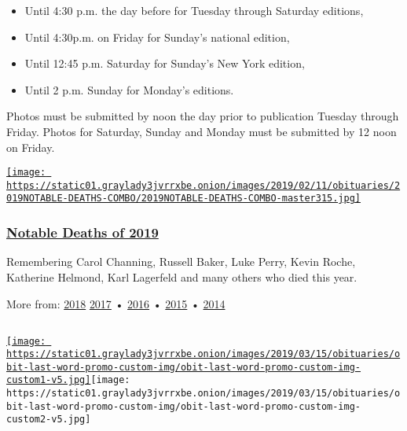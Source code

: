 \begin{itemize}
\tightlist
\item
  Until 4:30 p.m. the day before for Tuesday through Saturday editions,
\item
  Until 4:30p.m. on Friday for Sunday's national edition,
\item
  Until 12:45 p.m. Saturday for Sunday's New York edition,
\item
  Until 2 p.m. Sunday for Monday's editions.
\end{itemize}

Photos must be submitted by noon the day prior to publication Tuesday
through Friday. Photos for Saturday, Sunday and Monday must be submitted
by 12 noon on Friday.

\href{https://www.nytimes3xbfgragh.onion/interactive/2019/obituaries/notable-deaths.html}{\texttt{[image: https://static01.graylady3jvrrxbe.onion/images/2019/02/11/obituaries/2019NOTABLE-DEATHS-COMBO/2019NOTABLE-DEATHS-COMBO-master315.jpg]}}

\hypertarget{notable-deaths-of-2019}{%
\subsubsection{\texorpdfstring{\href{https://www.nytimes3xbfgragh.onion/interactive/2019/obituaries/notable-deaths.html}{Notable
Deaths of 2019}}{Notable Deaths of 2019}}\label{notable-deaths-of-2019}}

Remembering Carol Channing, Russell Baker, Luke Perry, Kevin Roche,
Katherine Helmond, Karl Lagerfeld and many others who died this year.

More from:
\href{https://www.nytimes3xbfgragh.onion/interactive/2018/obituaries/notable-deaths.html}{2018}
\href{https://www.nytimes3xbfgragh.onion/interactive/projects/notable-deaths/2017}{2017}
•
\href{https://www.nytimes3xbfgragh.onion/interactive/projects/notable-deaths/2016}{2016}
•
\href{https://www.nytimes3xbfgragh.onion/interactive/2015/obituaries/notable-deaths-2015.html}{2015}
•
\href{https://www.nytimes3xbfgragh.onion/interactive/2014/obituaries/notable-deaths-2014.html}{2014}

\subsection{}

\href{https://www.nytimes3xbfgragh.onion/video/last-word}{\texttt{[image: https://static01.graylady3jvrrxbe.onion/images/2019/03/15/obituaries/obit-last-word-promo-custom-img/obit-last-word-promo-custom-img-custom1-v5.jpg]}}\texttt{[image: https://static01.graylady3jvrrxbe.onion/images/2019/03/15/obituaries/obit-last-word-promo-custom-img/obit-last-word-promo-custom-img-custom2-v5.jpg]}

